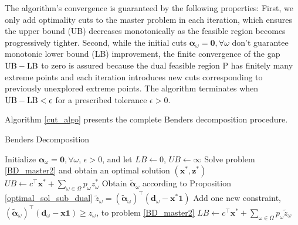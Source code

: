 The algorithm's convergence is guaranteed by the following properties: First, we only add optimality cuts to the master problem in each iteration, which ensures the upper bound (UB) decreases monotonically as the feasible region becomes progressively tighter. Second, while the initial cuts $\bm{\alpha}_{\omega} = \mathbf{0}, \forall \omega$ don't guarantee monotonic lower bound (LB) improvement, the finite convergence of the gap $\textup{UB} - \textup{LB}$ to zero is assured because the dual feasible region P has finitely many extreme points and each iteration introduces new cuts corresponding to previously unexplored extreme points. The algorithm terminates when $\textup{UB} - \textup{LB} < \epsilon$ for a prescribed tolerance $\epsilon >0$.







Algorithm \ref{cut_algo} presents the complete Benders decomposition procedure.

\begin{algorithm}[ht]
  \caption{Benders Decomposition}\label{cut_algo}
  Initialize $\bm{\alpha}_{\omega} = \mathbf{0}, \forall \omega$, $\epsilon >0$, and let $LB \gets 0$, $UB \gets \infty$\;
    {Solve problem \eqref{BD_master2} and obtain an optimal solution $(\mathbf{x}^{*}, \mathbf{z}^{*})$\;
    $UB \gets c^{\intercal} \mathbf{x}^{*} + \sum_{\omega \in \Omega} p_{\omega} z_{\omega}^{*}$\;
    {Obtain $\bm{\tilde{\alpha}}_{\omega}$ according to Proposition \ref{optimal_sol_sub_dual}\; $\tilde{z}_{\omega}= (\bm{\tilde{\alpha}}_{\omega})^{\intercal}(\mathbf{d}_{\omega}- \mathbf{x}^{*} \mathbf{1})$\;
    {Add one new constraint, $(\bm{\tilde{\alpha}}_{\omega})^{\intercal}(\mathbf{d}_{\omega}- \mathbf{x} \mathbf{1}) \geq z_{\omega}$, to problem \eqref{BD_master2}\;}
    }
    {$LB \gets c^{\intercal} \mathbf{x}^{*} + \sum_{\omega \in \Omega} p_{\omega} \tilde{z}_{\omega} $\;}
    }
\end{algorithm}



